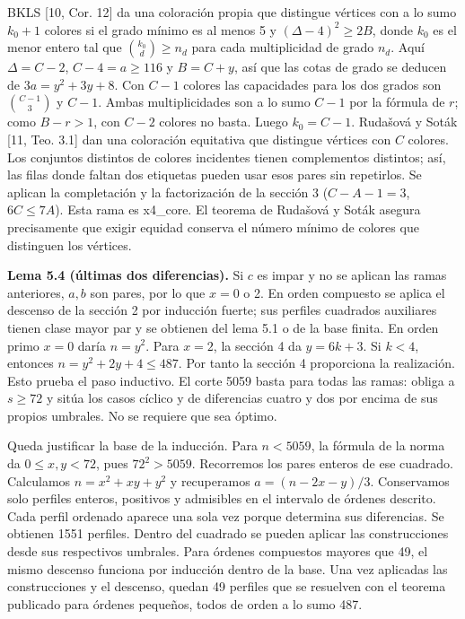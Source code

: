 \documentclass[spanish,11pt,a4paper]{article}
\begin{document}
BKLS {[}10, Cor. 12{]} da una coloración propia que distingue vértices con a lo sumo \(k_0+1\) colores si el grado mínimo es al menos 5 y \((\Delta-4)^2\ge2B\), donde \(k_0\) es el menor entero tal que \(\binom{k_0}{d}\ge n_d\) para cada multiplicidad de grado \(n_d\). Aquí \(\Delta=C-2\), \(C-4=a\ge116\) y \(B=C+y\), así que las cotas de grado se deducen de \(3a=y^2+3y+8\). Con \(C-1\) colores las capacidades para los dos grados son \(\binom{C-1}3\) y \(C-1\). Ambas multiplicidades son a lo sumo \(C-1\) por la fórmula de \(r\); como \(B-r>1\), con \(C-2\) colores no basta. Luego \(k_0=C-1\). Rudašová y Soták {[}11, Teo. 3.1{]} dan una coloración equitativa que distingue vértices con \(C\) colores. Los conjuntos distintos de colores incidentes tienen complementos distintos; así, las filas donde faltan dos etiquetas pueden usar esos pares sin repetirlos. Se aplican la completación y la factorización de la sección 3 (\(C-A-1=3\), \(6C\le7A\)). Esta rama es x4\_core. El teorema de Rudašová y Soták asegura precisamente que exigir equidad conserva el número mínimo de colores que distinguen los vértices.

\textbf{Lema 5.4 (últimas dos diferencias).} Si \(c\) es impar y no se aplican las ramas anteriores, \(a,b\) son pares, por lo que \(x=0\) o 2. En orden compuesto se aplica el descenso de la sección 2 por inducción fuerte; sus perfiles cuadrados auxiliares tienen clase mayor par y se obtienen del lema 5.1 o de la base finita. En orden primo \(x=0\) daría \(n=y^2\). Para \(x=2\), la sección 4 da \(y=6k+3\). Si \(k<4\), entonces \(n=y^2+2y+4\le487\). Por tanto la sección 4 proporciona la realización. Esto prueba el paso inductivo. El corte 5059 basta para todas las ramas: obliga a \(s\ge72\) y sitúa los casos cíclico y de diferencias cuatro y dos por encima de sus propios umbrales. No se requiere que sea óptimo.

Queda justificar la base de la inducción. Para \(n<5059\), la fórmula de la norma da \(0\le x,y<72\), pues \(72^2>5059\). Recorremos los pares enteros de ese cuadrado. Calculamos \(n=x^2+xy+y^2\) y recuperamos \(a=(n-2x-y)/3\). Conservamos solo perfiles enteros, positivos y admisibles en el intervalo de órdenes descrito. Cada perfil ordenado aparece una sola vez porque determina sus diferencias. Se obtienen 1551 perfiles. Dentro del cuadrado se pueden aplicar las construcciones desde sus respectivos umbrales. Para órdenes compuestos mayores que 49, el mismo descenso funciona por inducción dentro de la base. Una vez aplicadas las construcciones y el descenso, quedan 49 perfiles que se resuelven con el teorema publicado para órdenes pequeños, todos de orden a lo sumo 487.
\end{document}
